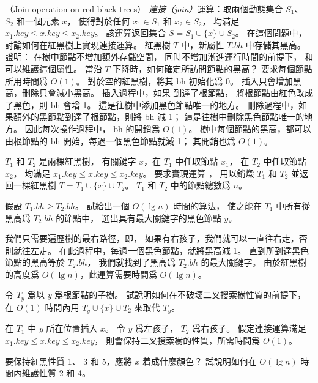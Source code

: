 \startPROBLEM
（Join operation on red-black trees）
\emph{連接（join）}運算：取兩個動態集合 $S_1$、 $S_2$ 和一個元素 $x$，
使得對於任何 $x_1\in S_1$ 和 $x_2\in S_2$，
均滿足 $x_{1}.key \le x.key \le x_{2}.key$。
該運算返回集合 $S=S_1 \cup \{x\} \cup S_2$。
在這個問題中，討論如何在紅黑樹上實現連接運算。
\startigBase[a]\startitem%
紅黑樹 $T$ 中，新屬性 $T.bh$ 中存儲其黑高。證明：
在樹中節點不增加額外存儲空間，
同時不增加漸進運行時間的前提下，
  和  可以維護這個屬性。
當沿 $T$ 下降時，如何確定所訪問節點的黑高？
要求每個節點所用時間爲 $O(1)$。
\stopitem\stopigBase
\startANSWER
對於空的紅黑樹，將其 bh 初始化爲 0。
插入只會增加黑高，刪除只會減小黑高。
插入過程中，如果  到達了根節點，
將根節點由紅色改成了黑色，則 bh 會增 1。
這是往樹中添加黑色節點唯一的地方。
刪除過程中，如果額外的黑節點到達了根節點，則將 bh 減 1；
這是往樹中刪除黑色節點唯一的地方。
因此每次操作過程中， bh 的開銷爲 $O(1)$。
樹中每個節點的黑高，都可以由根節點的 bh 開始，每過一個黑色節點就減 1；
其開銷也爲 $O(1)$。
\stopANSWER

$T_1$ 和 $T_2$ 是兩棵紅黑樹，
有關鍵字 $x$，在 $T_1$ 中任取節點 $x_1$，
在 $T_2$ 中任取節點 $x_2$，
均滿足 $x_1.key\le x.key\le x_2.key$。
要求實現運算 ，
用以銷燬 $T_1$ 和 $T_2$ 並返回一棵紅黑樹 $T=T_1\cup \{x\} \cup T_2$。
 $T_1$ 和 $T_2$ 中的節點總數爲 $n$。

\startigBase[a,continue]\startitem%
假設 $T_{1}.bh\ge T_{2}.bh$。
試給出一個 $O(\lg n)$ 時間的算法，
使之能在 $T_1$ 中所有從黑高爲 $T_{2}.bh$ 的節點中，
選出具有最大關鍵字的黑色節點 $y$。
\stopitem\stopigBase

\startANSWER
我們只需要遍歷樹的最右路徑，即，
如果有右孩子，我們就可以一直往右走，否則就往左走。
在此過程中，每過一個黑色節點，就將黑高減 1。
直到所到達黑色節點的黑高等於 $T_2.bh$，
我們就找到了黑高爲 $T_2.bh$ 的最大關鍵字。
由於紅黑樹的高度爲 $O(\lg n)$，此運算需要時間爲 $O(\lg n)$。
\stopANSWER

\startigBase[a,continue]\startitem%
令 $T_y$ 爲以 $y$ 爲根節點的子樹。
試說明如何在不破壞二叉搜索樹性質的前提下，
在 $O(1)$ 時間內用 $T_y\cup \{x\} \cup T_2$ 來取代 $T_y$。
\stopitem\stopigBase

\startANSWER
在 $T_1$ 中 $y$ 所在位置插入 $x$。
令 $y$ 爲左孩子， $T_2$ 爲右孩子。
假定連接運算滿足 $x_1.key\le x.key\le x_2.key$，
則會保持二叉搜索樹的性質，所需時間爲 $O(1)$。
\stopANSWER

\startigBase[a,continue]\startitem%
要保持紅黑性質 1、 3 和 5，應將 $x$ 着成什麼顏色？
試說明如何在 $O(\lg n)$ 時間內維護性質 2 和 4。
\stopitem\stopigBase

